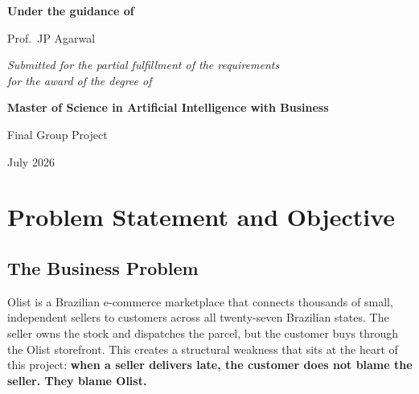 \documentclass[11pt,a4paper]{report}
\begin{document}
\begin{titlepage}
\vspace{0.80cm}

{\large\bfseries Under the guidance of\par}
\vspace{0.28cm}
{\normalsize Prof.\ JP Agarwal\par}

\vspace{0.85cm}

{\normalsize\itshape Submitted for the partial fulfillment of the requirements\\[0.14cm]
for the award of the degree of\par}
\vspace{0.25cm}
{\normalsize\bfseries Master of Science in Artificial Intelligence with Business\par}

\vspace{0.75cm}
{\normalsize Final Group Project\par}
\vspace{0.16cm}
{\normalsize July 2026\par}

\vfill
\end{titlepage}

\setcounter{page}{1}

\tableofcontents
\clearpage

\listoffigures
\clearpage

\listoftables
\clearpage

\setcounter{page}{1}

\chapter{Problem Statement and Objective}

\section{The Business Problem}

Olist is a Brazilian e-commerce marketplace that connects thousands of small,
independent sellers to customers across all twenty-seven Brazilian states. The
seller owns the stock and dispatches the parcel, but the customer buys through
the Olist storefront. This creates a structural weakness that sits at the heart
of this project: \textbf{when a seller delivers late, the customer does not
blame the seller. They blame Olist.}
\end{document}
